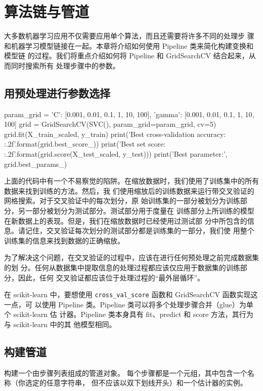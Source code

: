 \chapter{算法链与管道}
大多数机器学习应用不仅需要应用单个算法，而且还需要将许多不同的处理步
骤和机器学习模型链接在一起。本章将介绍如何使用 Pipeline 类来简化构建变换和模型链
的过程。我们将重点介绍如何将 Pipeline 和 GridSearchCV 结合起来，从而同时搜索所有
处理步骤中的参数。
\section{用预处理进行参数选择}
\begin{pyc}
    param_grid = {'C': [0.001, 0.01, 0.1, 1, 10, 100],
    'gamma': [0.001, 0.01, 0.1, 1, 10, 100]}
    grid = GridSearchCV(SVC(), param_grid=param_grid, cv=5)
    grid.fit(X_train_scaled, y_train)
    print('Best cross-validation accuracy: {:.2f}'.format(grid.best_score_))
    print('Best set score: {:.2f}'.format(grid.score(X_test_scaled, y_test)))
    print('Best parameter:', grid.best_params_)
\end{pyc}

上面的代码中有一个不易察觉的陷阱。在缩放数据时，我们使用了训练集中的所有数据来找到训练的方法。然后，我
们使用缩放后的训练数据来运行带交叉验证的网格搜索。对于交叉验证中的每次划分，原
始训练集的一部分被划分为训练部分，另一部分被划分为测试部分。测试部分用于度量在
训练部分上所训练的模型在新数据上的表现。但是，我们在缩放数据时已经使用过测试部
分中所包含的信息。请记住，交叉验证每次划分的测试部分都是训练集的一部分，我们使
用整个训练集的信息来找到数据的正确缩放。

为了解决这个问题，在交叉验证的过程中，应该在进行任何预处理之前完成数据集的划
分。任何从数据集中提取信息的处理过程都应该仅应用于数据集的训练部分，因此，任何
交叉验证都应该位于处理过程的“最外层循环”。

在 scikit-learn 中，要想使用 \verb|cross_val_score| 函数和 GridSearchCV 函数实现这一点，可
以使用 Pipeline 类。Pipeline 类可以将多个处理步骤合并（glue）为单个 scikit-learn 估
计器。Pipeline 类本身具有 fit、predict 和 score 方法，其行为与 scikit-learn 中的其
他模型相同。
\section{构建管道}
构建一个由步骤列表组成的管道对象。
每个步骤都是一个元组，其中包含一个名称（你选定的任意字符串， 但不应该以双下划线开头）和一个估计器的实例。

